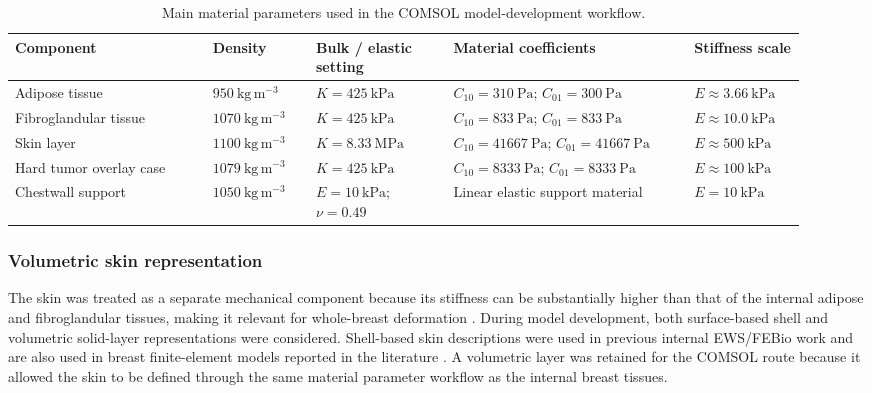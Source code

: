 \begin{table}[H]
\centering
\small
\caption{Main material parameters used in the COMSOL model-development workflow.}
\label{material_parameter_sets_table}
\begin{tabular}{p{0.23\linewidth} p{0.12\linewidth} p{0.16\linewidth} p{0.28\linewidth} p{0.13\linewidth}}
\toprule
Component 
& Density 
& Bulk / elastic setting 
& Material coefficients 
& Stiffness scale \\
\midrule
Adipose tissue 
& $950~\mathrm{kg\,m^{-3}}$ 
& $K=425~\mathrm{kPa}$ 
& $C_{10}=310~\mathrm{Pa}$; $C_{01}=300~\mathrm{Pa}$ 
& $E\approx3.66~\mathrm{kPa}$ \\

Fibroglandular tissue 
& $1070~\mathrm{kg\,m^{-3}}$ 
& $K=425~\mathrm{kPa}$ 
& $C_{10}=833~\mathrm{Pa}$; $C_{01}=833~\mathrm{Pa}$ 
& $E\approx10.0~\mathrm{kPa}$ \\

Skin layer 
& $1100~\mathrm{kg\,m^{-3}}$ 
& $K=8.33~\mathrm{MPa}$ 
& $C_{10}=41667~\mathrm{Pa}$; $C_{01}=41667~\mathrm{Pa}$ 
& $E\approx500~\mathrm{kPa}$ \\

Hard tumor overlay case
& $1079~\mathrm{kg\,m^{-3}}$
& $K=425~\mathrm{kPa}$ 
& $C_{10}=8333~\mathrm{Pa}$; $C_{01}=8333~\mathrm{Pa}$ 
& $E\approx100~\mathrm{kPa}$ \\

Chestwall support 
& $1050~\mathrm{kg\,m^{-3}}$ 
& $E=10~\mathrm{kPa}$; $\nu=0.49$ 
& Linear elastic support material 
& $E=10~\mathrm{kPa}$ \\
\bottomrule
\end{tabular}
\end{table}

\subsubsection{Volumetric skin representation}
\label{volumetric_skin_representation}

The skin was treated as a separate mechanical component because its stiffness can be substantially higher than that of the internal adipose and fibroglandular tissues, making it relevant for whole-breast deformation \cite{Chen2025,Teixeira2023}. During model development, both surface-based shell and volumetric solid-layer representations were considered. Shell-based skin descriptions were used in previous internal EWS/FEBio work \cite{EngelsEWSReport,StormEWSReport} and are also used in breast finite-element models reported in the literature \cite{Chen2025}. A volumetric layer was retained for the COMSOL route because it allowed the skin to be defined through the same material parameter workflow as the internal breast tissues.

